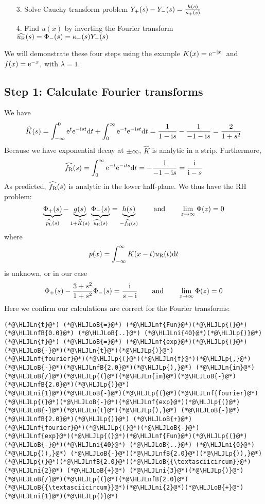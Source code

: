 \documentclass[12pt,landscape]{article}
\newcommand{\HLJLn}[1]{#1}
\newcommand{\HLJLnf}[1]{\textcolor[RGB]{66,102,213}{#1}}
\newcommand{\HLJLnfB}[1]{\textcolor[RGB]{59,151,46}{#1}}
\newcommand{\HLJLni}[1]{\textcolor[RGB]{59,151,46}{#1}}
\newcommand{\HLJLoB}[1]{\textcolor[RGB]{102,102,102}{\textbf{#1}}}
\newcommand{\HLJLp}[1]{#1}
\def\qqand{\qquad\hbox{and}\qquad}
\def\D{ {\rm d} }
\def\I{ {\rm i} }
\def\E{ {\rm e} }
\def\fR{ f_{\rm R} }
\def\dt{\D t}
\begin{document}
{\begin{itemize}
\item[3. ] Solve Cauchy transform problem $Y_+(s) - Y_-(s) = {h(s) \over \kappa_+(s)}$


\item[4. ] Find $u(x)$ by inverting the Fourier transform $\widehat{u_{\rm R}}(s) = \Phi_-(s) = \kappa_-(s) Y_-(s)$

\end{itemize}
We will demonstrate these four steps using the example $K(x) = \E^{-|x|}$ and $f(x) = \E^{-x}$, with $\lambda = 1$.
\newpage
\subsection{Step 1: Calculate Fourier transforms}
We have
\[
\widehat{K}(s) = \int_{-\infty}^0 \E^{t}\E^{-\I s t} \dt + \int_0^\infty \E^{-t} \E^{-\I s t} \dt =
 {1 \over 1-\I s} - {1 \over -1-\I s} = {2 \over 1+s^2}
\]
Because we have exponential decay at $\pm \infty$, $\widehat{K}$ is analytic in a strip. Furthermore,
\[
\widehat{f_{\rm R}}(s) = \int_0^\infty \E^{-t} \E^{-\I t s} \dt = -{1 \over -1-\I s} = {\I \over \I-s}
\]
As predicted, $\widehat{\fR}(s)$ is analytic in the lower half-plane. We thus have the RH problem:
\[
\underbrace{\Phi_+(s)}_{\widehat{p_{\rm L}}(s)} - \underbrace{g(s)}_{1 + \widehat K(s)}
\underbrace{\Phi_-(s)}_{\widehat{u_{\rm R}}(s)} = \underbrace{h(s)}_{-\widehat{\fR}(s)} \qqand \lim_{z \to \infty}\Phi(z) = 0
\]
where
\[
p(x) = \int_{-\infty}^\infty K(x-t)u_{\rm R}(t) \dt
\]
is unknown, or in our case
\[
\Phi_+(s) - {3 + s^2 \over 1 + s^2} \Phi_-(s) = {\I \over s - \I} \qqand \lim_{z \to \infty}\Phi(z) = 0
\]
Here we confirm our calculations are correct for the Fourier transforms:


\begin{lstlisting}
(*@\HLJLn{t}@*) (*@\HLJLoB{=}@*) (*@\HLJLnf{Fun}@*)(*@\HLJLp{(}@*)(*@\HLJLnfB{0.0}@*) (*@\HLJLoB{..}@*) (*@\HLJLni{40}@*)(*@\HLJLp{)}@*)
(*@\HLJLn{f}@*) (*@\HLJLoB{=}@*) (*@\HLJLnf{exp}@*)(*@\HLJLp{(}@*)(*@\HLJLoB{-}@*)(*@\HLJLn{t}@*)(*@\HLJLp{)}@*)
(*@\HLJLnf{fourier}@*)(*@\HLJLp{(}@*)(*@\HLJLn{f}@*)(*@\HLJLp{,}@*) (*@\HLJLoB{-}@*)(*@\HLJLnfB{2.0}@*)(*@\HLJLp{),}@*) (*@\HLJLn{im}@*)(*@\HLJLoB{/}@*)(*@\HLJLp{(}@*)(*@\HLJLn{im}@*)(*@\HLJLoB{-}@*)(*@\HLJLnfB{2.0}@*)(*@\HLJLp{)}@*)
(*@\HLJLni{1}@*)(*@\HLJLoB{-}@*)(*@\HLJLp{(}@*)(*@\HLJLnf{fourier}@*)(*@\HLJLp{(}@*)(*@\HLJLoB{-}@*)(*@\HLJLnf{exp}@*)(*@\HLJLp{(}@*)(*@\HLJLoB{-}@*)(*@\HLJLn{t}@*)(*@\HLJLp{),}@*) (*@\HLJLoB{-}@*)(*@\HLJLnfB{2.0}@*)(*@\HLJLp{)}@*) (*@\HLJLoB{+}@*) (*@\HLJLnf{fourier}@*)(*@\HLJLp{(}@*)(*@\HLJLoB{-}@*)(*@\HLJLnf{exp}@*)(*@\HLJLp{(}@*)(*@\HLJLnf{Fun}@*)(*@\HLJLp{(}@*)(*@\HLJLoB{-}@*)(*@\HLJLni{40}@*) (*@\HLJLoB{..}@*) (*@\HLJLni{0}@*)(*@\HLJLp{)),}@*) (*@\HLJLoB{-}@*)(*@\HLJLnfB{2.0}@*)(*@\HLJLp{)),}@*) (*@\HLJLp{(}@*)(*@\HLJLnfB{2.0}@*)(*@\HLJLoB{{\textasciicircum}}@*)(*@\HLJLni{2}@*) (*@\HLJLoB{+}@*) (*@\HLJLni{3}@*)(*@\HLJLp{)}@*)(*@\HLJLoB{/}@*)(*@\HLJLp{(}@*)(*@\HLJLnfB{2.0}@*)(*@\HLJLoB{{\textasciicircum}}@*)(*@\HLJLni{2}@*)(*@\HLJLoB{+}@*)(*@\HLJLni{1}@*)(*@\HLJLp{)}@*)
\end{lstlisting}

}
\end{document}
